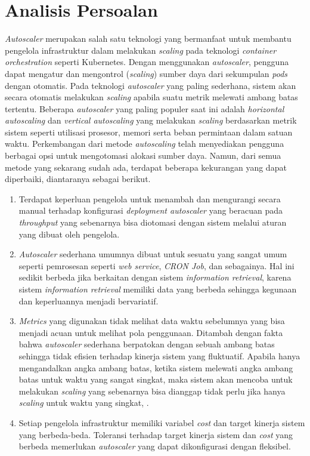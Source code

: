 \section{Analisis Persoalan}

\textit{Autoscaler} merupakan salah satu teknologi yang bermanfaat untuk membantu pengelola infrastruktur dalam melakukan \textit{scaling} pada teknologi \textit{container orchestration} seperti Kubernetes. Dengan menggunakan \textit{autoscaler}, pengguna dapat mengatur dan mengontrol (\textit{scaling}) sumber daya dari sekumpulan \textit{pods} dengan otomatis. Pada teknologi \textit{autoscaler} yang paling sederhana, sistem akan secara otomatis melakukan \textit{scaling} apabila suatu metrik melewati ambang batas tertentu. Beberapa \textit{autoscaler} yang paling populer saat ini adalah \textit{horizontal autoscaling} dan \textit{vertical autoscaling} yang melakukan \textit{scaling} berdasarkan metrik sistem seperti utilisasi prosesor, memori serta beban permintaan dalam satuan waktu. Perkembangan dari metode \textit{autoscaling} telah menyediakan pengguna berbagai opsi untuk mengotomasi alokasi sumber daya. Namun, dari semua metode yang sekarang sudah ada, terdapat beberapa kekurangan yang dapat diperbaiki, diantaranya sebagai berikut.

\begin{enumerate}
    \item Terdapat keperluan pengelola untuk menambah dan mengurangi secara manual terhadap konfigurasi \textit{deployment autoscaler} yang beracuan pada \textit{throughput} yang sebenarnya bisa diotomasi dengan sistem melalui aturan yang dibuat oleh pengelola.
    \item \textit{Autoscaler} sederhana umumnya dibuat untuk sesuatu yang sangat umum seperti pemrosesan seperti \textit{web service}, \textit{CRON Job}, dan sebagainya. Hal ini sedikit berbeda jika berkaitan dengan sistem \textit{information retrieval}, karena sistem \textit{information retrieval} memiliki data yang berbeda sehingga kegunaan dan keperluannya menjadi bervariatif.
    \item \textit{Metrics} yang digunakan tidak melihat data waktu sebelumnya yang bisa menjadi acuan untuk melihat pola penggunaan. Ditambah dengan fakta bahwa \textit{autoscaler} sederhana berpatokan dengan sebuah ambang batas sehingga tidak efisien terhadap kinerja sistem yang fluktuatif. Apabila hanya mengandalkan angka ambang batas, ketika sistem melewati angka ambang batas untuk waktu yang sangat singkat, maka sistem akan mencoba untuk melakukan \textit{scaling} yang sebenarnya bisa dianggap tidak perlu jika hanya \textit{scaling} untuk waktu yang singkat, \parencite{riset1}. 
    \item Setiap pengelola infrastruktur memiliki variabel \textit{cost} dan target kinerja sistem yang berbeda-beda. Toleransi terhadap target kinerja sistem dan \textit{cost} yang berbeda memerlukan \textit{autoscaler} yang dapat dikonfigurasi dengan fleksibel.
\end{enumerate}


